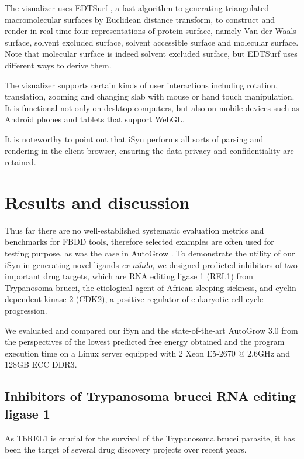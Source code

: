 The visualizer uses EDTSurf \citep{1297,1350}, a fast algorithm to generating triangulated macromolecular surfaces by Euclidean distance transform, to construct and render in real time four representations of protein surface, namely Van der Waals surface, solvent excluded surface, solvent accessible surface and molecular surface. Note that molecular surface is indeed solvent excluded surface, but EDTSurf uses different ways to derive them.

The visualizer supports certain kinds of user interactions including rotation, translation, zooming and changing slab with mouse or hand touch manipulation. It is functional not only on desktop computers, but also on mobile devices such as Android phones and tablets that support WebGL.

It is noteworthy to point out that iSyn performs all sorts of parsing and rendering in the client browser, ensuring the data privacy and confidentiality are retained.

\section{Results and discussion}

Thus far there are no well-established systematic evaluation metrics and benchmarks for FBDD tools, therefore selected examples are often used for testing purpose, as was the case in AutoGrow \citep{466,1354}. To demonstrate the utility of our iSyn in generating novel ligands \textit{ex nihilo}, we designed predicted inhibitors of two important drug targets, which are RNA editing ligase 1 (REL1) from Trypanosoma brucei, the etiological agent of African sleeping sickness, and cyclin-dependent kinase 2 (CDK2), a positive regulator of eukaryotic cell cycle progression.

We evaluated and compared our iSyn and the state-of-the-art AutoGrow 3.0 from the perspectives of the lowest predicted free energy obtained and the program execution time on a Linux server equipped with 2 Xeon E5-2670 @ 2.6GHz and 128GB ECC DDR3.

\subsection{Inhibitors of Trypanosoma brucei RNA editing ligase 1}

As TbREL1 is crucial for the survival of the Trypanosoma brucei parasite, it has been the target of several drug discovery projects over recent years.

